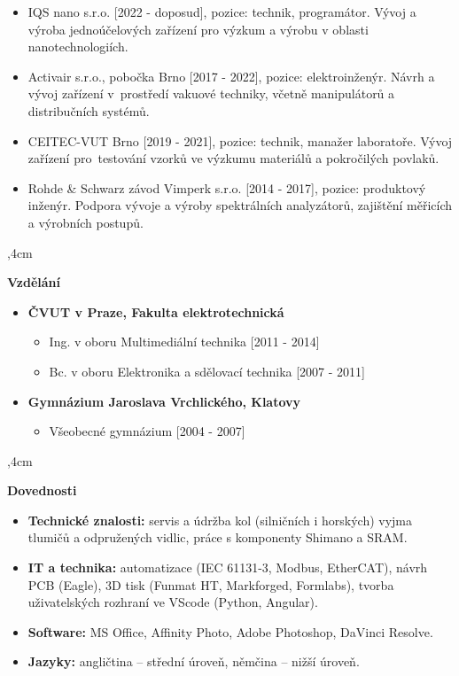 \documentclass[10pt]{article}
\begin{document}
\begin{itemize}
\item IQS nano s.r.o. [2022 - doposud], pozice: technik, programátor. Vývoj a výroba jednoúčelových zařízení pro výzkum a výrobu v oblasti nanotechnologiích.
\item Activair s.r.o., pobočka Brno [2017 - 2022], pozice: elektroinženýr. Návrh a vývoj zařízení v~prostředí vakuové techniky, včetně manipulátorů a distribučních systémů.
\item CEITEC-VUT Brno [2019 - 2021], pozice: technik, manažer laboratoře. Vývoj zařízení pro~testování vzorků ve výzkumu materiálů a pokročilých povlaků.
\item Rohde \& Schwarz závod Vimperk s.r.o. [2014 - 2017], pozice: produktový inženýr. Podpora vývoje a výroby spektrálních analyzátorů, zajištění měřicích a výrobních postupů. 
\end{itemize}

\noindent\hrulefill
{},4cm


\textbf{Vzdělání}

\begin{itemize}
    \item [\faGraduationCap]\textbf{ČVUT v Praze, Fakulta elektrotechnická }
    \begin{itemize}
        \item Ing. v oboru Multimediální technika [2011 - 2014]
        \item Bc. v oboru Elektronika a sdělovací technika [2007 - 2011]
    \end{itemize}
    \item[\faGraduationCap] \textbf{Gymnázium Jaroslava Vrchlického, Klatovy }
    \begin{itemize}
        \item Všeobecné gymnázium [2004 - 2007]
    \end{itemize}
\end{itemize}

\noindent\hrulefill
{},4cm

\clearpage

\textbf{Dovednosti}

\begin{itemize}
    \item \textbf{Technické znalosti:} servis a údržba kol (silničních i horských) vyjma tlumičů a odpružených vidlic, práce s komponenty Shimano a SRAM. 
    \item \textbf{IT a technika:} automatizace (IEC 61131-3, Modbus, EtherCAT), návrh PCB (Eagle), 3D tisk (Funmat HT, Markforged, Formlabs), tvorba uživatelských rozhraní ve VScode (Python, Angular).
    \item \textbf{Software:} MS Office, Affinity Photo, Adobe Photoshop, DaVinci Resolve.
    \item \textbf{Jazyky:} angličtina – střední úroveň, němčina – nižší úroveň.
\end{itemize}
\end{document}
